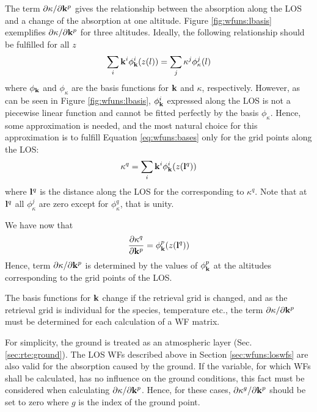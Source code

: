 The term $\partial\kappa/ \partial \mathbf{k}^p$ gives the relationship
 between the absorption along the LOS and a change of the absorption
 at one altitude.  Figure \ref{fig:wfuns:lbasis} exemplifies
 $\partial\kappa/ \partial \mathbf{k}^p$ for three altitudes. Ideally, the
 following relationship should be fulfilled for all $z$
 \begin{equation}
   \sum_i\mathbf{k}^i\phi^i_{\mathbf{k}}(z(l)) = \sum_j \kappa^j\phi^j_{\kappa}(l)
  \label{eq:wfuns:bases}
 \end{equation}
 where $\phi_{\mathbf{k}}$ and $\phi_{\kappa}$ are the basis functions for
 $\mathbf{k}$ and $\kappa$, respectively. However, as can be seen in
 Figure \ref{fig:wfuns:lbasis}, $\phi^i_{\mathbf{k}}$ expressed along the
 LOS is not a piecewise linear function and cannot be fitted perfectly
 by the basis $\phi_{\kappa}$. Hence, some approximation is needed,
 and the most natural choice for this approximation is to fulfill
 Equation \ref{eq:wfuns:bases} only for the grid points along the LOS:
 \begin{equation}
   \kappa^q = \sum_i\mathbf{k}^i\phi^i_{\mathbf{k}}(z(\mathbf{l}^q))
 \end{equation}
 where $\mathbf{l}^q$ is the distance along the LOS for the corresponding to
 $\kappa^q$. Note that at $\mathbf{l}^q$ all $\phi_{\kappa}^j$ are zero except
 for $\phi_{\kappa}^q$, that is unity.

 We have now that
 \begin{equation}
   \frac{\partial \kappa^q}{\partial \mathbf{k}^p} = \phi^p_{\mathbf{k}}(z(\mathbf{l}^q))
  \label{eq:wfuns:kappak}
 \end{equation}
 Hence, term $\partial\kappa/ \partial \mathbf{k}^p$ is determined by the
 values of $\phi^p_{\mathbf{k}}$ at the altitudes corresponding to the grid
 points of the LOS.

 The basis functions for $\mathbf{k}$ change if the retrieval grid is
 changed, and as the retrieval grid is individual for the species, 
 temperature etc., the term $\partial\kappa/ \partial \mathbf{k}^p$ 
 must be determined for each calculation of a WF matrix.


  \label{sec:wfuns:ground}
  For simplicity, the ground is treated as an atmospheric layer (Sec.
  \ref{sec:rte:ground}). The LOS WFs described above in Section
  \ref{sec:wfuns:loswfs} are also valid for the absorption caused by
  the ground. If the variable, for which WFs shall be calculated, has
  no influence on the ground conditions, this fact must be considered
  when calculating $\partial \kappa / \partial \mathbf{k}^p$. Hence, 
  for these cases, $\partial \kappa^g / \partial \mathbf{k}^p$ should
  be set to zero where $g$ is the index of the ground point.


